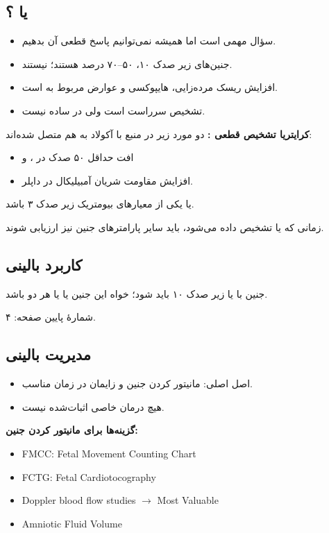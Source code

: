 \documentclass[12pt,a4paper]{article}
\begin{document}
\subsection*{ یا ؟}
\begin{itemize}
\item سؤال مهمی است اما همیشه نمی‌توانیم پاسخ قطعی آن بدهیم.
\item جنین‌های زیر صدک ۱۰، ۵۰–۷۰ درصد  هستند؛  نیستند.
\item افزایش ریسک مرده‌زایی، هایپوکسی و عوارض مربوط به  است.
\item تشخیص  سرراست است ولی در  ساده نیست.
\end{itemize}

\textbf{کرایتریا تشخیص قطعی :} دو مورد زیر در منبع با آکولاد به هم متصل شده‌اند:
\begin{itemize}
\item افت حداقل ۵۰ صدک در ، و
\item افزایش مقاومت شریان آمبیلیکال در داپلر.
\end{itemize}
یا یکی از معیارهای بیومتریک زیر صدک ۳ باشد.

زمانی که  یا  تشخیص داده می‌شود، باید سایر پارامترهای جنین نیز ارزیابی شوند.

\subsection*{کاربرد بالینی}
جنین با  یا  زیر صدک ۱۰ باید  شود؛ خواه این جنین  یا  یا هر دو باشد.

\FGheader\par
شمارهٔ پایین صفحه: ۴.

\subsection*{مدیریت بالینی}
\begin{itemize}
\item اصل اصلی: مانیتور کردن جنین و زایمان در زمان مناسب.
\item هیچ درمان خاصی اثبات‌شده نیست.
\end{itemize}

\textbf{گزینه‌ها برای مانیتور کردن جنین:}
\begin{latin}
\begin{itemize}
\item FMCC: Fetal Movement Counting Chart
\item FCTG: Fetal Cardiotocography
\item Doppler blood flow studies \(\longrightarrow\) Most Valuable
\item Amniotic Fluid Volume
\end{itemize}
\end{latin}
\end{document}

